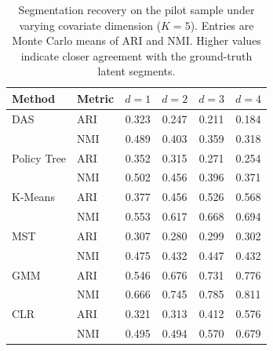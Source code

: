 \begin{table}[htbp]
\centering
\caption{Segmentation recovery on the pilot sample under varying covariate dimension ($K=5$). Entries are Monte Carlo means of ARI and NMI. Higher values indicate closer agreement with the ground-truth latent segments.}
\label{tab:app-ari-nmi-varying-d}
\begin{tabular}{llcccc}
\toprule
Method & Metric & $d=1$ & $d=2$ & $d=3$ & $d=4$ \\
\midrule
DAS & ARI & 0.323 & 0.247 & 0.211 & 0.184 \\
 & NMI & 0.489 & 0.403 & 0.359 & 0.318 \\
\addlinespace
Policy Tree & ARI & 0.352 & 0.315 & 0.271 & 0.254 \\
 & NMI & 0.502 & 0.456 & 0.396 & 0.371 \\
\addlinespace
K-Means & ARI & 0.377 & 0.456 & 0.526 & 0.568 \\
 & NMI & 0.553 & 0.617 & 0.668 & 0.694 \\
\addlinespace
MST & ARI & 0.307 & 0.280 & 0.299 & 0.302 \\
 & NMI & 0.475 & 0.432 & 0.447 & 0.432 \\
\addlinespace
GMM & ARI & 0.546 & 0.676 & 0.731 & 0.776 \\
 & NMI & 0.666 & 0.745 & 0.785 & 0.811 \\
\addlinespace
CLR & ARI & 0.321 & 0.313 & 0.412 & 0.576 \\
 & NMI & 0.495 & 0.494 & 0.570 & 0.679 \\
\bottomrule
\end{tabular}
\end{table}
